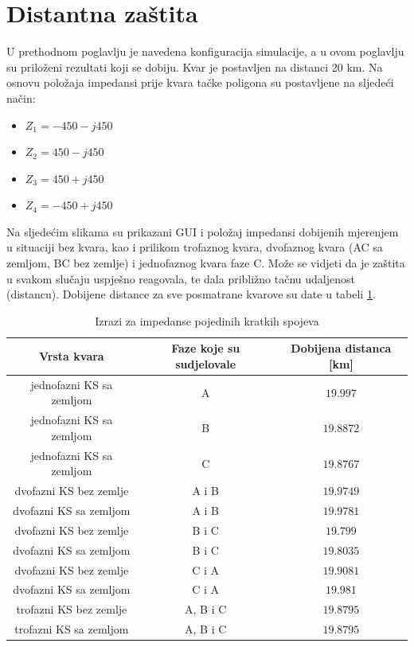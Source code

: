 \section{Distantna zaštita}

U prethodnom poglavlju je navedena konfiguracija simulacije, a u ovom poglavlju su priloženi rezultati koji se dobiju. Kvar je postavljen na distanci 20 km. Na osnovu položaja impedansi prije kvara tačke poligona su postavljene na sljedeći način:

\begin{itemize}
    \item $Z_1 = -450 - j450$
    \item $Z_2 = 450 - j450$
    \item $Z_3 = 450 + j450$
    \item $Z_4 = -450 + j450$
\end{itemize}

Na sljedećim slikama su prikazani GUI i položaj impedansi dobijenih mjerenjem u situaciji bez kvara, kao i prilikom trofaznog kvara, dvofaznog kvara (AC sa zemljom, BC bez zemlje) i jednofaznog kvara faze C. Može se vidjeti da je zaštita u svakom slučaju uspješno reagovala, te dala približno tačnu udaljenost (distancu). Dobijene distance za sve posmatrane kvarove su date u tabeli \ref{tab:distance}.


\renewcommand{\arraystretch}{1.5}%
\begin{table} [!htbp]
  \caption{Izrazi za impedanse pojedinih kratkih spojeva}
  \begin{center}
  \begin{tabular}{ | c | c | c | }
	\hline
      \textbf{Vrsta kvara} & \textbf{Faze koje su sudjelovale} & \textbf{Dobijena distanca [km]} \\
    \hline 
    \hline 
     jednofazni KS sa zemljom & A &  $19.997$ \\[10pt]
    \hline
    jednofazni KS sa zemljom & B &  $19.8872$ \\[10pt]
    \hline
    jednofazni KS sa zemljom & C &  $19.8767$ \\[10pt]
    \hline
    dvofazni KS bez zemlje & A i B &  $19.9749$ \\[10pt]
    \hline
    dvofazni KS sa zemljom & A i B &  $19.9781$ \\[10pt]
    \hline
    dvofazni KS bez zemlje & B i C &  $19.799$ \\[10pt]
    \hline
    dvofazni KS sa zemljom & B i C &  $19.8035$ \\[10pt]
    \hline
     dvofazni KS bez zemlje & C i A &  $19.9081$ \\[10pt]
    \hline
     dvofazni KS sa zemljom & C i A &  $19.981$ \\[10pt]
    \hline
    trofazni KS bez zemlje & A, B i C &  $19.8795$ \\[10pt]
    \hline
     trofazni KS sa zemljom & A, B i C &  $19.8795$ \\[10pt]
    \hline
  \end{tabular}
  \label{tab:distance}    
\end{center} 
\end{table}
\renewcommand{\arraystretch}{1} %

